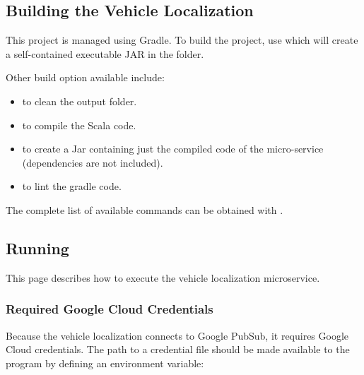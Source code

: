 \documentclass[letterpaper,10pt,english]{sphinxmanual}
\begin{document}
\subsection{Building the Vehicle Localization}
\label{\detokenize{microservices/vehicle_localization/building:building-the-vehicle-localization}}\label{\detokenize{microservices/vehicle_localization/building:building-vehicle-localization}}\label{\detokenize{microservices/vehicle_localization/building::doc}}
This project is managed using Gradle.
To build the project, use  which will create a self-contained executable JAR in the  folder.

Other build option available include:
\begin{itemize}
\item {} 
 to clean the output folder.

\item {} 
 to compile the Scala code.

\item {} 
 to create a Jar containing just the compiled code of the micro-service (dependencies are not included).

\item {} 
 to lint the gradle code.

\end{itemize}

The complete list of available commands can be obtained with .


\subsection{Running}
\label{\detokenize{microservices/vehicle_localization/running:running}}\label{\detokenize{microservices/vehicle_localization/running::doc}}
This page describes how to execute the vehicle localization microservice.


\subsubsection{Required Google Cloud Credentials}
\label{\detokenize{microservices/vehicle_localization/running:required-google-cloud-credentials}}
Because the vehicle localization connects to Google PubSub, it requires Google Cloud credentials.
The path to a credential file should be made available to the program by defining an environment variable:
\end{document}

